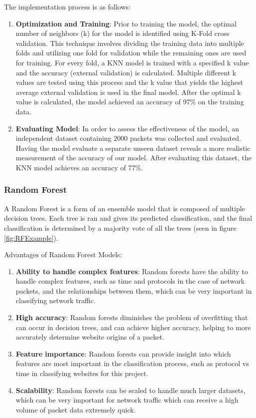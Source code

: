 \documentclass[10pt,sigconf,letterpaper,nonacm]{acmart}
\begin{document}
The implementation process is as follows: 
\begin{enumerate}
  \item \textbf{Optimization and Training}: Prior to training the model, the optimal number of neighbors (k) for the model is identified using K-Fold cross validation. This technique involves dividing the training data into multiple folds and utilizing one fold for validation while the remaining ones are used for training. For every fold, a KNN model is trained with a specified k value and the accuracy (external validation) is calculated. Multiple different k values are tested using this process and the k value that yields the highest average external validation is used in the final model. After the optimal k value is calculated, the model achieved an accuracy of 97\% on the training data. 
  
  \item \textbf{Evaluating Model}: In order to assess the effectiveness of the model, an independent dataset containing 2000 packets was collected and evaluated. Having the model evaluate a separate unseen dataset reveals a more realistic measurement of the accuracy of our model. After evaluating this dataset, the KNN model achieves an accuracy of 77\%.
\end{enumerate}

\subsubsection{Random Forest}
A Random Forest is a form of an ensemble model that is composed of multiple decision trees. Each tree is ran and gives its predicted classification, and the final classification is determined by a majority vote of all the trees (seen in figure \ref{fig:RFExample}).

Advantages of Random Forest Models:
\begin{enumerate}
  \item \textbf{Ability to handle complex features}: Random forests have the ability to handle complex features, such as time and protocols in the case of network packets, and the relationships between them, which can be very important in classifying network traffic.
  \item \textbf{High accuracy}: Random forests diminishes the problem of overfitting that can occur in decision trees, and can achieve higher accuracy, helping to more accurately determine website origins of a packet.
  \item \textbf{Feature importance}: Random forests can provide insight into which features are most important in the classification process, such as protocol vs time in classifying websites for this project.
  \item \textbf{Scalability}: Random forests can be scaled to handle much larger datasets, which can be very important for network traffic which can receive a high volume of packet data extremely quick.
\end{enumerate}
\end{document}
